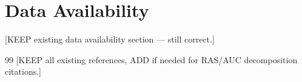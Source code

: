 \documentclass[11pt,a4paper]{article}
\begin{document}
\section*{Data Availability}
[KEEP existing data availability section — still correct.]

\begin{thebibliography}{99}
[KEEP all existing references, ADD if needed for RAS/AUC decomposition citations.]
\end{thebibliography}
\end{document}
